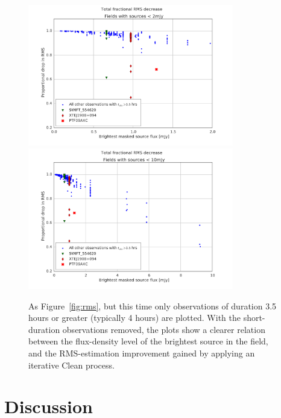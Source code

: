 \documentclass[5p,authoryear]{elsarticle}
\begin{document}
\begin{figure}[p]
\begin{center}  
  \includegraphics[width=0.8\textwidth]{../figures/rms_to_2mjy_4hrs}
  \includegraphics[width=0.8\textwidth]{../figures/rms_to_10mjy_4hrs}
  \caption[Fractional RMS decrease vs. brightest source flux for long-duration observations]{%
  \label{fig:rms_long_duration}
  As Figure~\ref{fig:rms}, but this time only observations of duration 3.5 hours or greater (typically 4 hours) are plotted. 
  With the short-duration observations removed, the plots show a clearer relation between the flux-density level of the brightest source in the field, and the RMS-estimation improvement gained by applying an iterative Clean process.
} 
\end{center} 
\end{figure}


\section{Discussion}
\label{sec:discussion}
\end{document}
